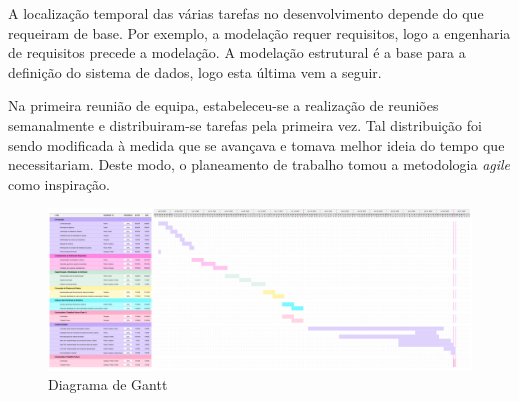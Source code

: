         A localização temporal das várias tarefas no desenvolvimento depende do que requeiram de base. Por exemplo, a modelação requer requisitos, logo a engenharia de requisitos precede a modelação. A modelação estrutural é a base para a definição do sistema de dados, logo esta última vem a seguir.

        Na primeira reunião de equipa, estabeleceu-se a realização de reuniões semanalmente e distribuiram-se tarefas pela primeira vez. Tal distribuição foi sendo modificada à medida que se avançava e tomava melhor ideia do tempo que necessitariam. Deste modo, o planeamento de trabalho tomou a metodologia \textit{agile} como inspiração. 
        
        \begin{figure}[h!]
            \centering
            \includegraphics[width=\textwidth]{images/gantt.png}
            \caption{Diagrama de Gantt}
            \label{Diagrama de Gantt}
        \end{figure}
    

